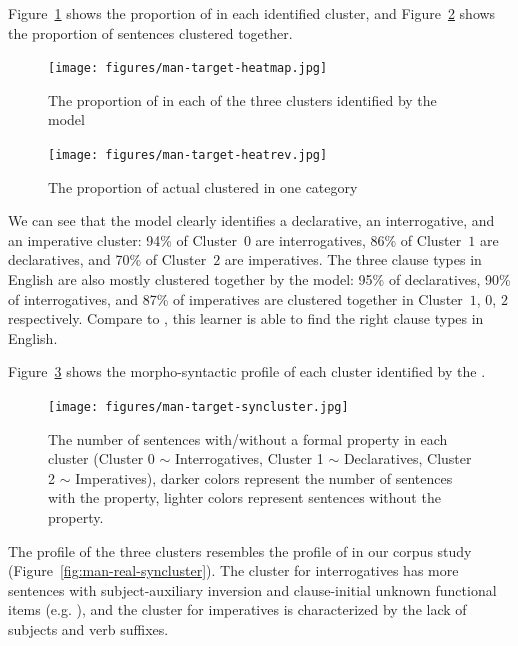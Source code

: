 Figure~\ref{fig:man-target-heatmap} shows the proportion of \diis{} in each identified cluster, and Figure~\ref{fig:man-target-heatrev} shows the proportion of sentences clustered together. 
\begin{figure}[H]
    \centering
    \texttt{[image: figures/man-target-heatmap.jpg]}
    \caption{The proportion of \diis{} in each of the three clusters identified by the \plearnerabbr{} model}
    \label{fig:man-target-heatmap}
\end{figure}




\begin{figure}[H]
    \centering
    \texttt{[image: figures/man-target-heatrev.jpg]}
    \caption{The proportion of actual \diis{} clustered in one category}
    \label{fig:man-target-heatrev}
\end{figure}


We can see that the \plearnerabbr{} model clearly identifies a declarative, an interrogative, and an imperative cluster: 94\% of Cluster~$0$ are interrogatives, 86\% of Cluster~$1$ are declaratives, and 70\% of Cluster~$2$ are imperatives. The three clause types in English are also mostly clustered together by the model: 95\% of declaratives, 90\% of interrogatives, and 87\% of imperatives are clustered together in Cluster~$1$, $0$, $2$ respectively. Compare to \dlearnerabbr{}, this learner is able to find the right clause types in English.


Figure~\ref{fig:man-target-syncluster} shows the morpho-syntactic profile of each cluster identified by the \plearnerabbr{}. 

\begin{figure}[H]
    \centering
    \texttt{[image: figures/man-target-syncluster.jpg]}
    \caption{The number of sentences with/without a formal property in each cluster (Cluster 0 $\sim$ Interrogatives, Cluster 1 $\sim$ Declaratives, Cluster 2 $\sim$ Imperatives), darker colors represent the number of sentences with the property, lighter colors represent sentences without the property.}
    \label{fig:man-target-syncluster}
\end{figure}

The profile of the three clusters resembles the profile of \diis{} in our corpus study (Figure~\ref{fig:man-real-syncluster}). The cluster for interrogatives has more sentences with subject-auxiliary inversion and clause-initial unknown functional items (e.g. \twh{}), and the cluster for imperatives is characterized by the lack of subjects and verb suffixes. 

